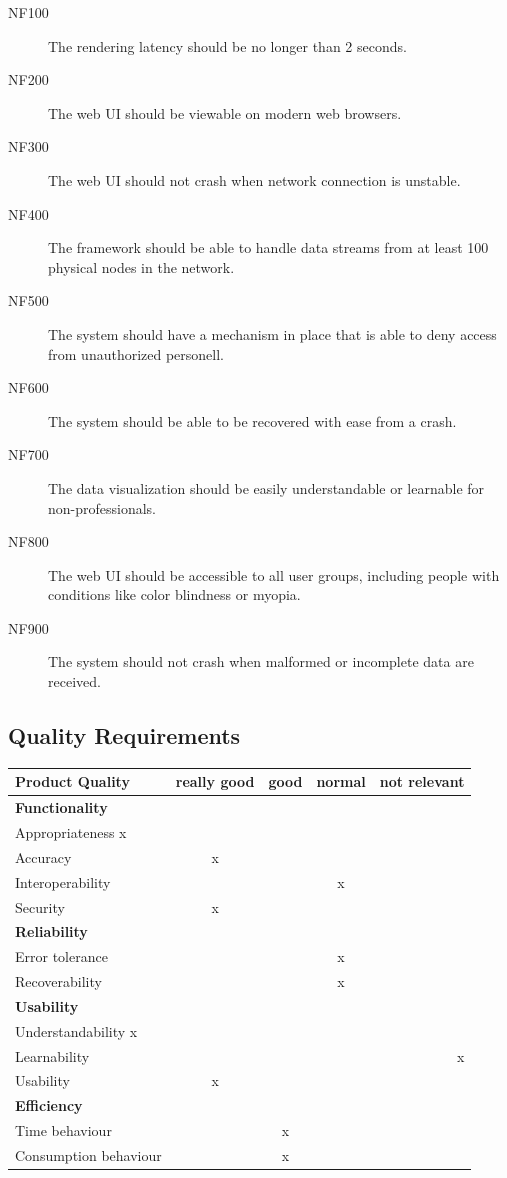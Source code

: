 \documentclass[twoside, english, draft]{Pflichtenheft}
\begin{document}
\begin{description}

  \item[NF100]
  The rendering latency should be no longer than 2 seconds.

  \item[NF200]
  The web UI should be viewable on modern web browsers.

  \item[NF300]
	The web UI should not crash when network connection is unstable.
	
  \item[NF400]
  The framework should be able to handle \glspl{data stream} from at least 100 physical nodes in the network.
	
	\item[NF500]
	The system should have a mechanism in place that is able to deny access from unauthorized personell.

	\item[NF600]
	The system should be able to be recovered with ease from a crash.

	\item[NF700]
	The data visualization should be easily understandable or learnable for non-professionals.

	\item[NF800]
	The web UI should be accessible to all user groups, including people with conditions like color blindness or myopia.

	\item[NF900]
	The system should not crash when malformed or incomplete data are received.

\end{description}
\subsection{Quality Requirements}

\begin{tabular}{l*{3}{c}r}
Product Quality              & really good & good & normal & not relevant  \\
\hline
\textbf{Functionality} &  &  &  &    \\
Appropriateness x & & & & \\
Accuracy  & x & & & \\
Interoperability & & & x & \\
Security & x & & & \\
\textbf{Reliability} &  &  &  &    \\
Error tolerance & & & x & \\
Recoverability & & & x & \\
\textbf{Usability} &  &  &  &    \\
Understandability x & & & & \\
Learnability & & & & x \\
Usability & x & & & \\

\textbf{Efficiency} &  &  &  &    \\
Time behaviour & & x & & \\
Consumption behaviour & & x & & \\
\end{tabular}
\end{document}
